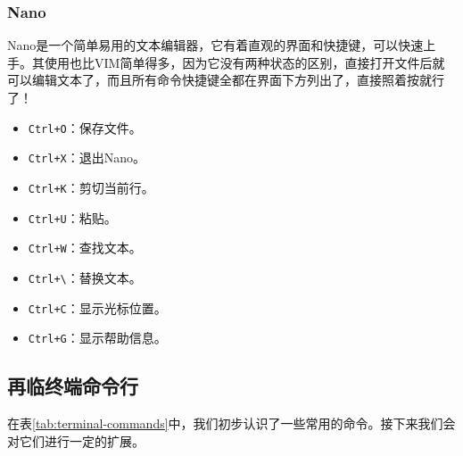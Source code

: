 \documentclass[../main.tex]{subfiles}
\begin{document}
\subsubsection{Nano}

Nano是一个简单易用的文本编辑器，它有着直观的界面和快捷键，可以快速上手。其使用也比VIM简单得多，因为它没有两种状态的区别，直接打开文件后就可以编辑文本了，而且所有命令快捷键全都在界面下方列出了，直接照着按就行了！

\begin{multicols}{2}
\begin{itemize}
  \item \texttt{Ctrl+O}：保存文件。
  \item \texttt{Ctrl+X}：退出Nano。
  \item \texttt{Ctrl+K}：剪切当前行。
  \item \texttt{Ctrl+U}：粘贴。
  \item \texttt{Ctrl+W}：查找文本。
  \item \texttt{Ctrl+\textbackslash}：替换文本。
  \item \texttt{Ctrl+C}：显示光标位置。
  \item \texttt{Ctrl+G}：显示帮助信息。
\end{itemize}
\end{multicols}

\subsection{再临终端命令行}

在表\ref{tab:terminal-commands}中，我们初步认识了一些常用的命令。接下来我们会对它们进行一定的扩展。
\end{document}
